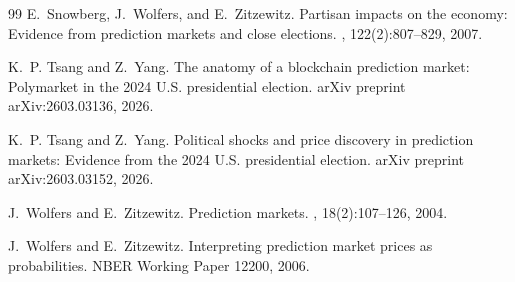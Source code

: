 \documentclass{article}
\begin{document}
\begin{thebibliography}{99}
E.~Snowberg, J.~Wolfers, and E.~Zitzewitz.
\newblock Partisan impacts on the economy: Evidence from prediction markets and
  close elections.
, 122(2):807--829, 2007.

K.~P. Tsang and Z.~Yang.
\newblock The anatomy of a blockchain prediction market: Polymarket in the 2024
  U.S. presidential election.
\newblock arXiv preprint arXiv:2603.03136, 2026.

K.~P. Tsang and Z.~Yang.
\newblock Political shocks and price discovery in prediction markets: Evidence
  from the 2024 U.S. presidential election.
\newblock arXiv preprint arXiv:2603.03152, 2026.

J.~Wolfers and E.~Zitzewitz.
\newblock Prediction markets.
, 18(2):107--126, 2004.

J.~Wolfers and E.~Zitzewitz.
\newblock Interpreting prediction market prices as probabilities.
\newblock NBER Working Paper 12200, 2006.

\end{thebibliography}
\end{document}
